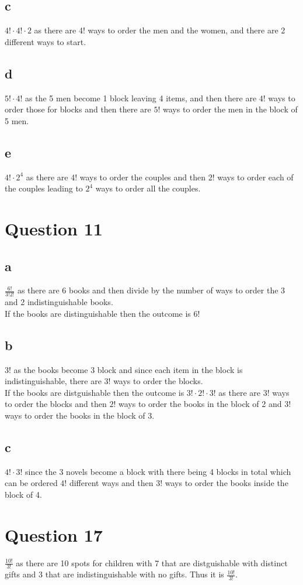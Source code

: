 \documentclass{article}
\begin{document}
\subsection*{c}
$4! \cdot 4! \cdot 2$ as there are 4! ways to order the men and the women, and there are 2 different ways to start.
\subsection*{d}
$5! \cdot 4!$ as the 5 men become 1 block leaving 4 items, and then there are $4!$ ways to order those for blocks and then there are $5!$ ways to order the men in the block of 5 men.
\subsection*{e}
$4! \cdot 2^{4}$ as there are 4! ways to order the couples and then 2! ways to order each of the couples leading to $2^{4}$ ways to order all the couples.
\section*{Question 11}
\subsection*{a}
$\frac{6!}{3!2!}$ as there are 6 books and then divide by the number of ways to order the 3 and 2 indistinguishable books. \\
If the books are distinguishable then the outcome is $6!$
\subsection*{b}
$3!$ as the books become 3 block and since each item in the block is indistinguishable, there are 3! ways to order the blocks.\\
If the books are distguishable then the outcome is $3! \cdot 2! \cdot 3!$ as there are $3!$ ways to order the blocks and then $2!$ ways to order the books in the block of 2 and $3!$ ways to order the books in the block of 3.
\subsection*{c}
$4!\cdot 3!$ since the 3 novels become a block with there being 4 blocks in total which can be ordered $4!$ different ways and then $3!$ ways to order the books inside the block of 4.
\section*{Question 17}
$\frac{10!}{3!}$ as there are 10 spots for children with 7 that are distguishable with distinct gifts and 3 that are indistinguishable with no gifts. Thus it is $\frac{10!}{3!}$.
\end{document}
